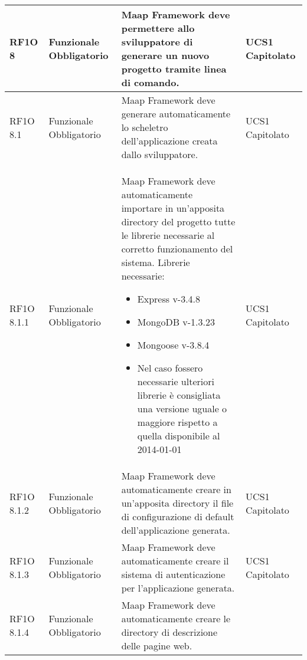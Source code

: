\begin{center}
\begin{longtable}{ | l | p{2cm} | p{5cm} | p{1.7cm} |}
        RF1O 8  & Funzionale \newline  Obbligatorio  & Maap Framework deve permettere allo sviluppatore di generare un nuovo progetto tramite linea di comando.
 &  UCS1 \newline  Capitolato \newline  \\ \hline      
        RF1O 8.1  & Funzionale \newline  Obbligatorio  & Maap Framework deve generare automaticamente lo scheletro dell'applicazione creata dallo sviluppatore.
 &  UCS1 \newline  Capitolato \newline  \\ \hline      
        RF1O 8.1.1  & Funzionale \newline  Obbligatorio  & Maap Framework deve automaticamente importare in un'apposita directory del progetto tutte le librerie necessarie al corretto funzionamento del sistema.
Librerie necessarie:
\begin{itemize}
\item Express v-3.4.8
\item MongoDB v-1.3.23
\item Mongoose v-3.8.4
\item Nel caso fossero necessarie ulteriori librerie è consigliata una versione uguale o maggiore rispetto a quella disponibile al 2014-01-01
\end{itemize}
 &  UCS1 \newline  Capitolato \newline  \\ \hline      
        RF1O 8.1.2 & Funzionale \newline  Obbligatorio  & Maap Framework deve automaticamente creare in un'apposita directory il file di configurazione di default dell'applicazione generata.
 &  UCS1 \newline  Capitolato \newline  \\ \hline      
        RF1O 8.1.3  & Funzionale \newline  Obbligatorio  & Maap Framework deve automaticamente creare il sistema di autenticazione per l'applicazione generata. &  UCS1 \newline  Capitolato \newline  \\ \hline      
        RF1O 8.1.4  & Funzionale \newline  Obbligatorio  & Maap Framework deve automaticamente creare le directory di descrizione delle pagine web.

\end{longtable}
\end{center}
